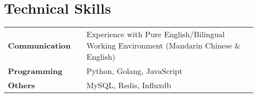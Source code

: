 \documentclass[a4,10pt]{article}
\newenvironment{zitemize}{
\begin{itemize}\itemsep0pt \parskip0pt \parsep1pt}
{\end{itemize}\vspace{-0.5cm}}
\newcommand{\hskills}[1]{
\textbf{\bfseries #1} }
\begin{document}







\section{Technical Skills}
\begin{tabular}{p{11em} p{1em} p{43em}}
\hskills{Communication} & & Experience with Pure English/Bilingual Working Environment (Mandarin Chinese \& English)  \\
\hskills{Programming} &  & Python, Golang, JavaScript \\
\hskills{Others} & & MySQL, Redis, Influxdb
\end{tabular}
\vspace{-0.2cm}



\end{document}
